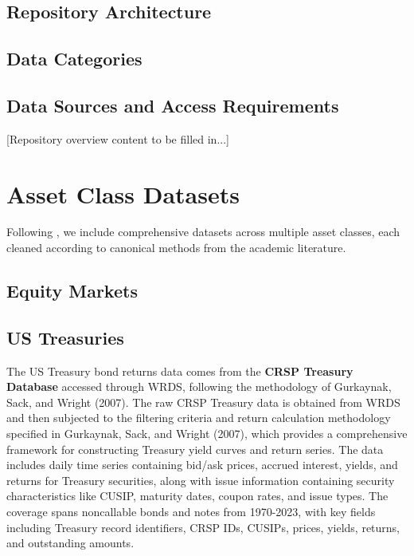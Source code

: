 \documentclass{article}
\begin{document}
\subsection{Repository Architecture}

\subsection{Data Categories}

\subsection{Data Sources and Access Requirements}

[Repository overview content to be filled in...]

\section{Asset Class Datasets}
\label{sec:asset_classes}


Following \cite{He2017}, we include comprehensive datasets across multiple asset classes, each cleaned according to canonical methods from the academic literature.

\subsection{Equity Markets}
\label{sec:equity}

\subsection{US Treasuries}
\label{sec:treasuries}
The US Treasury bond returns data comes from the \textbf{CRSP Treasury Database} accessed through WRDS, following the methodology of Gurkaynak, Sack, and Wright (2007). The raw CRSP Treasury data is obtained from WRDS and then subjected to the filtering criteria and return calculation methodology specified in Gurkaynak, Sack, and Wright (2007), which provides a comprehensive framework for constructing Treasury yield curves and return series. The data includes daily time series containing bid/ask prices, accrued interest, yields, and returns for Treasury securities, along with issue information containing security characteristics like CUSIP, maturity dates, coupon rates, and issue types. The coverage spans noncallable bonds and notes from 1970-2023, with key fields including Treasury record identifiers, CRSP IDs, CUSIPs, prices, yields, returns, and outstanding amounts.
\end{document}
